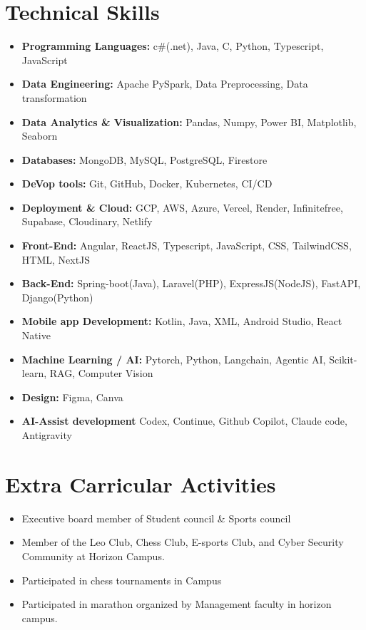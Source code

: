 \documentclass[10pt,a4paper]{article}
\begin{document}
\section{Technical Skills}
\begin{itemize}[leftmargin=2pt, label={}, itemsep=2pt]
  \item \textbf{Programming Languages:} c\#(.net), Java, C, Python, Typescript, JavaScript
  \item \textbf{Data Engineering: }Apache PySpark, Data Preprocessing, Data transformation
  \item \textbf{Data Analytics \& Visualization: }Pandas, Numpy, Power BI, Matplotlib, Seaborn
  \item \textbf{Databases:} MongoDB, MySQL, PostgreSQL, Firestore
  \item \textbf{DeVop tools:} Git, GitHub, Docker, Kubernetes, CI/CD
  \item \textbf{Deployment \& Cloud:} GCP, AWS, Azure, Vercel, Render, Infinitefree, Supabase, Cloudinary, Netlify
  \item \textbf{Front-End:} Angular, ReactJS, Typescript, JavaScript, CSS, TailwindCSS, HTML, NextJS
  \item \textbf{Back-End:} Spring-boot(Java), Laravel(PHP), ExpressJS(NodeJS), FastAPI, Django(Python)
  \item \textbf{Mobile app Development:} Kotlin, Java, XML, Android Studio, React Native
  \item \textbf{Machine Learning / AI:} Pytorch, Python, Langchain, Agentic AI, Scikit-learn, RAG, Computer Vision
  \item \textbf{Design: }Figma, Canva
  \item \textbf{AI-Assist development } Codex, Continue, Github Copilot, Claude code, Antigravity
  
\end{itemize}

\section{Extra Carricular Activities}
\begin{itemize}
  \item Executive board member of Student council \& Sports council
  \item Member of the Leo Club, Chess Club, E-sports Club, and Cyber Security Community at Horizon Campus.
  \item Participated in chess tournaments in Campus
  \item Participated in marathon organized by Management faculty in horizon campus.
\end{itemize}
\end{document}
